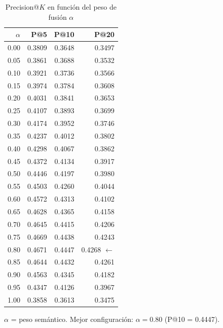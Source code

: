 \begin{table}[htbp]
  \centering
  \caption{Precision@$K$ en función del peso de fusión $\alpha$}
  \label{tab:recommendation_grid_search}
  \begin{tabular}{rrrr}
    \toprule
    $\alpha$ & P@5 & P@10 & P@20 \\
    \midrule
    0.00 & 0.3809 & 0.3648 & 0.3497 \\
    0.05 & 0.3861 & 0.3688 & 0.3532 \\
    0.10 & 0.3921 & 0.3736 & 0.3566 \\
    0.15 & 0.3974 & 0.3784 & 0.3608 \\
    0.20 & 0.4031 & 0.3841 & 0.3653 \\
    0.25 & 0.4107 & 0.3893 & 0.3699 \\
    0.30 & 0.4174 & 0.3952 & 0.3746 \\
    0.35 & 0.4237 & 0.4012 & 0.3802 \\
    0.40 & 0.4298 & 0.4067 & 0.3862 \\
    0.45 & 0.4372 & 0.4134 & 0.3917 \\
    0.50 & 0.4446 & 0.4197 & 0.3980 \\
    0.55 & 0.4503 & 0.4260 & 0.4044 \\
    0.60 & 0.4572 & 0.4313 & 0.4102 \\
    0.65 & 0.4628 & 0.4365 & 0.4158 \\
    0.70 & 0.4645 & 0.4415 & 0.4206 \\
    0.75 & 0.4669 & 0.4438 & 0.4243 \\
    0.80 & 0.4671 & 0.4447 & 0.4268 $\leftarrow$ \\
    0.85 & 0.4644 & 0.4432 & 0.4261 \\
    0.90 & 0.4563 & 0.4345 & 0.4182 \\
    0.95 & 0.4347 & 0.4126 & 0.3967 \\
    1.00 & 0.3858 & 0.3613 & 0.3475 \\
    \bottomrule
  \end{tabular}
  \begin{tablenotes}[flushleft]
    \small
    \item $\alpha$ = peso semántico. Mejor configuración: $\alpha = 0.80$ (P@10 = 0.4447).
  \end{tablenotes}
\end{table}
